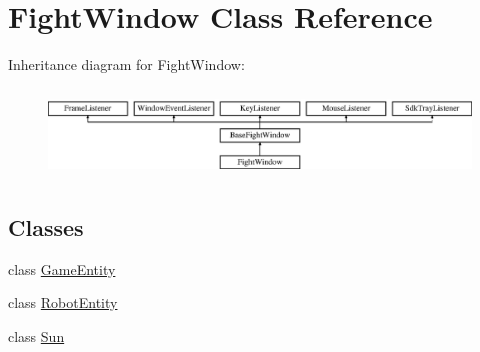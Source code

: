 \hypertarget{class_fight_window}{}\section{Fight\+Window Class Reference}
\label{class_fight_window}
Inheritance diagram for Fight\+Window\+:\begin{figure}[H]
\begin{center}
\leavevmode
\includegraphics[height=2.382979cm]{class_fight_window}
\end{center}
\end{figure}
\subsection*{Classes}
\begin{DoxyCompactItemize}
\item 
class \hyperlink{class_fight_window_1_1_game_entity}{Game\+Entity}
\item 
class \hyperlink{class_fight_window_1_1_robot_entity}{Robot\+Entity}
\item 
class \hyperlink{class_fight_window_1_1_sun}{Sun}
\end{DoxyCompactItemize}
